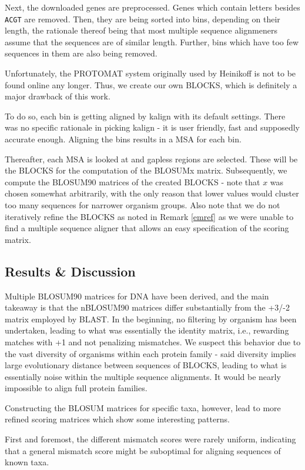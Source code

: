 \documentclass{article}
\begin{document}
Next, the downloaded genes are preprocessed. Genes which contain letters 
besides \texttt{ACGT} are removed. Then, they are being sorted into bins,
depending on their length, the rationale thereof being that most multiple
sequence alignmeners assume that the sequences are of similar length. Further,
bins which have too few sequences in them are also being removed.

Unfortunately, the PROTOMAT system originally used by Heinikoff is not to be
found online any longer. 
Thus, we create our own BLOCKS, which is definitely a major drawback of this work. 

To do so, each bin is getting aligned by kalign \cite{lassmannKalignAccurateFast2005} with
its default settings. There was no specific rationale in picking kalign - it is user friendly, fast and supposedly accurate enough. Aligning the bins results in a MSA for each bin.

Thereafter, each MSA is looked at and gapless regions are selected. 
These will be the BLOCKS for the computation of the BLOSUMx matrix.
Subsequently, we compute the BLOSUM90 matrices of the created BLOCKS - note that $x$ was chosen somewhat arbitrarily,
with the only reason that lower values would cluster too many sequences for narrower organism groups. Also note
that we do not iteratively refine the BLOCKS as noted in Remark \ref{emref}
as we were unable to find a multiple sequence aligner that allows an easy specification
of the scoring matrix.
\subsection*{Results \& Discussion}	
	Multiple BLOSUM90 matrices for DNA have been derived, and the main takeaway is that the nBLOSUM90 matrices differ substantially from the +3/-2 matrix employed by BLAST. 	
	In the beginning, no filtering by organism has been undertaken, leading 
	to what was essentially the identity matrix, i.e., rewarding matches with +1 and not penalizing mismatches. We suspect this behavior due to the vast diversity of organisms within each protein family - said diversity implies large evolutionary distance between sequences of BLOCKS, leading to what is essentially noise within the multiple sequence alignments. It would be nearly impossible to align full protein families.
	
	Constructing the BLOSUM matrices for specific taxa, however, lead to
	more refined scoring matrices which show some interesting patterns.

	First and foremost, the different mismatch scores were rarely uniform, indicating that a general mismatch score might be suboptimal for aligning sequences of known taxa. 
\end{document}
